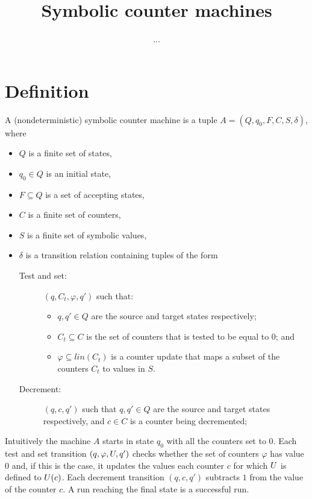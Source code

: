 \documentclass[letterpaper,11pt]{article}
\begin{document}
\title{Symbolic counter machines}

\author{...}
\maketitle

\section{Definition}

\begin{definition}
A (nondeterministic) symbolic counter machine is a tuple $A=(Q,q_0,F,C,S,\delta)$,
where
\begin{itemize}
\item $Q$ is a finite set of states,
\item $q_0\in Q$ is an initial state,
\item $F\subseteq Q$ is a set of accepting states,
\item $C$ is a finite set of counters,
\item $S$ is a finite set of symbolic values,
\item $\delta$ is a transition relation containing tuples of the form
\begin{description}
\item[Test and set:] $(q,C_t,\varphi,q')$ such that:
\begin{itemize}
\item $q,q'\in Q$ are the source and target states respectively;
\item $C_t\subseteq C$ is the set of counters that is tested to be equal to 0; and
\item $\varphi\subseteq lin(C_t)$ is a counter update that maps a subset of the counters $C_t$ to values in $S$.
\end{itemize}

\item[Decrement:] $(q,c,q')$ such that $q,q'\in Q$ are the source and target states respectively, and $c\in C$ is a counter being decremented;

\end{description}
\end{itemize}
\end{definition}


Intuitively the machine $A$ starts in state $q_0$ with all the counters set to $0$.
Each test and set transition $(q,\varphi,U,q')$ checks whether the set of counters
$\varphi$ has value $0$ and, if this is the case, it updates the values each
counter $c$ for which $U$ is defined to $U(c)$.
Each decrement transition $(q,c,q')$ subtracts $1$ from the value of the counter $c$.
A run reaching the final state is a successful run.
\end{document}
